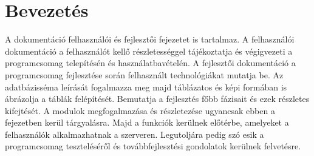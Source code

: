 \part{Bevezetés}
A dokumentáció felhasználói és fejlesztői fejezetet is tartalmaz. A felhasználói dokumentáció a felhasználót kellő részletességgel tájékoztatja és végigvezeti a programcsomag telepítésén és használatbavételén. A fejlesztői dokumentáció a programcsomag fejlesztése során felhasznált technológiákat mutatja be. Az adatbázisséma leírását fogalmazza meg majd táblázatos és képi formában is ábrázolja a táblák felépítését. Bemutatja a fejlesztés főbb fázisait és ezek részletes kifejtését. A modulok megfogalmazása és részletezése ugyancsak ebben a fejezetben kerül tárgyalásra. Majd a funkciók kerülnek előtérbe, amelyeket a felhasználók alkalmazhatnak a szerveren. Legutoljára pedig szó esik a programcsomag teszteléséről és továbbfejlesztési gondolatok kerülnek felvetésre.

\cleardoublepage
